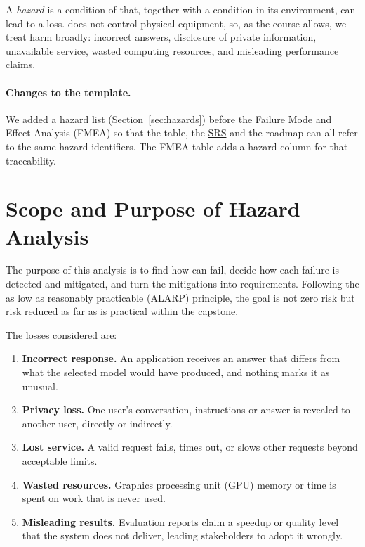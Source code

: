 \documentclass{article}
\newcommand{\srs}{\href{https://tandemkv.github.io/Tandem/SRS-Volere/SRS.pdf}{SRS}}
\begin{document}
A \emph{hazard} is a condition of \progname{} that, together with a
condition in its environment, can lead to a loss. \progname{} does not
control physical equipment, so, as the course allows, we treat harm
broadly: incorrect answers, disclosure of private information, unavailable
service, wasted computing resources, and misleading performance claims.

\paragraph{Changes to the template.} We added a hazard list
(Section~\ref{sec:hazards}) before the Failure Mode and Effect Analysis
(FMEA) so that the table, the \srs{} and the roadmap can all refer to the
same hazard identifiers. The FMEA table adds a hazard column for that
traceability.

\section{Scope and Purpose of Hazard Analysis}
\label{sec:scope}

The purpose of this analysis is to find how \progname{} can fail, decide
how each failure is detected and mitigated, and turn the mitigations into
requirements. Following the as low as reasonably practicable (ALARP)
principle, the goal is not zero risk but risk reduced as far as is
practical within the capstone.

The losses considered are:
\begin{enumerate}[label=L\arabic*., ref=L\arabic*]
  \item \label{loss:wrong} \textbf{Incorrect response.} An application
  receives an answer that differs from what the selected model would have
  produced, and nothing marks it as unusual.
  \item \label{loss:privacy} \textbf{Privacy loss.} One user's
  conversation, instructions or answer is revealed to another user,
  directly or indirectly.
  \item \label{loss:service} \textbf{Lost service.} A valid request
  fails, times out, or slows other requests beyond acceptable limits.
  \item \label{loss:waste} \textbf{Wasted resources.} Graphics processing
  unit (GPU) memory or time is spent on work that is never used.
  \item \label{loss:claims} \textbf{Misleading results.} Evaluation reports
  claim a speedup or quality level that the system does not deliver,
  leading stakeholders to adopt it wrongly.
\end{enumerate}
\end{document}
